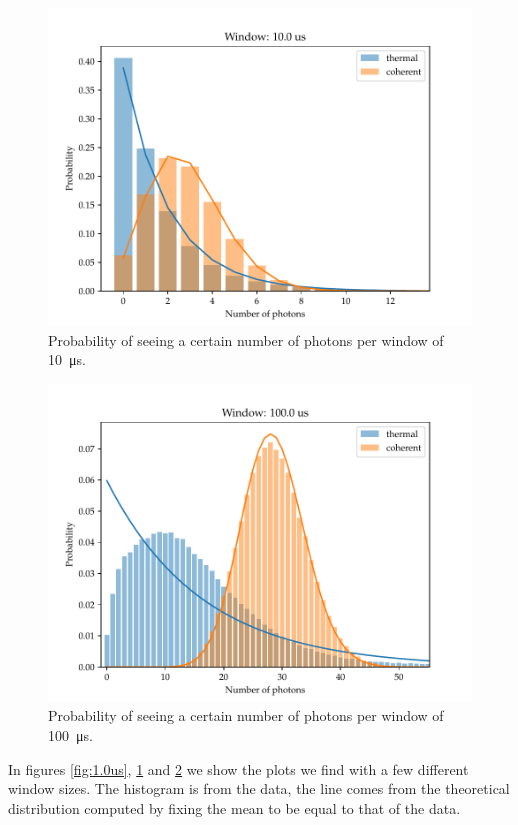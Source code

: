 \documentclass[main.tex]{subfiles}
\begin{document}
\begin{figure}[ht]
\centering
\includegraphics[width=\textwidth]{figures/10.0us}
\caption{Probability of seeing a certain number of photons per window of \SI{10}{\micro s}.}
\label{fig:10.0us}
\end{figure}

\begin{figure}[ht]
\centering
\includegraphics[width=\textwidth]{figures/100.0us}
\caption{Probability of seeing a certain number of photons per window of \SI{100}{\micro s}.}
\label{fig:100.0us}
\end{figure}

In figures \ref{fig:1.0us}, \ref{fig:10.0us} and \ref{fig:100.0us} we show the plots we find with a few different window sizes. The histogram is from the data, the line comes from the theoretical distribution computed by fixing the mean to be equal to that of the data.
\end{document}
